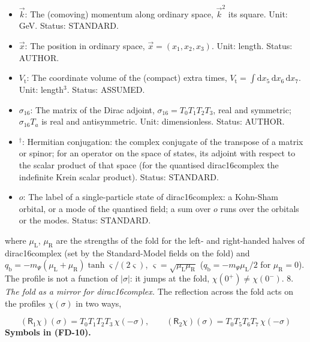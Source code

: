 \documentclass[
  10pt,
]{article}
\begin{document}
\begin{itemize}
  \(\propto \mathrm{e}^{-\mathrm{i}\omega x_4}\) (\(\omega_o\) of the
  orbital \(o\)). Unit: GeV. Status: STANDARD.
\item
  \(\vec k\): The (comoving) momentum along ordinary space, \(\vec k^2\)
  its square. Unit: GeV. Status: STANDARD.
\item
  \(\vec x\): The position in ordinary space,
  \(\vec x = (x_1, x_2, x_3)\). Unit: length. Status: AUTHOR.
\item
  \(V_{\mathrm{t}}\): The coordinate volume of the (compact) extra
  times,
  \(V_{\mathrm{t}} = \int\mathrm{d}x_5\,\mathrm{d}x_6\,\mathrm{d}x_7\).
  Unit: length\(^3\). Status: ASSUMED.
\item
  \(\sigma_{16}\): The matrix of the Dirac adjoint,
  \(\sigma_{16} = T_0T_1T_2T_3\), real and symmetric; \(\sigma_{16}T_a\)
  is real and antisymmetric. Unit: dimensionless. Status: AUTHOR.
\item
  \({}^\dagger\): Hermitian conjugation: the complex conjugate of the
  transpose of a matrix or spinor; for an operator on the space of
  states, its adjoint with respect to the scalar product of that space
  (for the quantised dirac16complex the indefinite Krein scalar
  product). Status: STANDARD.
\item
  \(o\): The label of a single-particle state of dirac16complex: a
  Kohn-Sham orbital, or a mode of the quantised field; a sum over \(o\)
  runs over the orbitals or the modes. Status: STANDARD.
\end{itemize}

where \(\mu_{\mathrm{L}}\), \(\mu_{\mathrm{R}}\) are the strengths of
the fold for the left- and right-handed halves of dirac16complex (set by
the Standard-Model fields on the fold) and
\(q_{\mathrm{b}} = -m_\Psi(\mu_{\mathrm{L}} + \mu_{\mathrm{R}})\tanh\varsigma/(2\varsigma)\),
\(\varsigma = \sqrt{\mu_{\mathrm{L}}\mu_{\mathrm{R}}}\)
(\(q_{\mathrm{b}} = -m_\Psi\mu_{\mathrm{L}}/2\) for
\(\mu_{\mathrm{R}} = 0\)). The profile is not a function of
\(\lvert\sigma\rvert\): it jumps at the fold,
\(\chi(0^+) \ne \chi(0^-)\). 8. \emph{The fold as a mirror for
dirac16complex.} The reflection across the fold acts on the profiles
\(\chi(\sigma)\) in two ways,

\[
(\mathsf{R}_1\chi)(\sigma) = T_0T_1T_2T_3\,\chi(-\sigma),\qquad (\mathsf{R}_2\chi)(\sigma) = T_0T_5T_6T_7\,\chi(-\sigma) \tag{FD-10}
\] \textbf{Symbols in (FD-10).}
\end{document}
